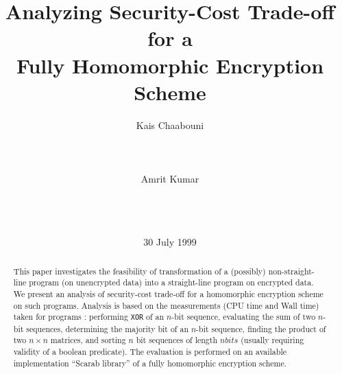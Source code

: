 \documentclass{acm_proc_article-sp}
\begin{document}
\title{Analyzing Security-Cost Trade-off for a \\ Fully Homomorphic Encryption Scheme}


%
\author{
\alignauthor
Kais Chaabouni \\
       \\
       \\
       \\
\alignauthor 
Amrit Kumar\\
       \\
       \\
       \\
}


\date{30 July 1999}
\maketitle
\begin{abstract}
This paper investigates the feasibility of transformation of a (possibly) non-straight-line program (on unencrypted data) into a straight-line program on encrypted data. We present an analysis of security-cost trade-off for a homomorphic encryption scheme on such programs. Analysis is based on the measurements (CPU time and  Wall time) taken for programs : performing \texttt{XOR} of an $n$-bit sequence,  evaluating the sum of two $n$-bit sequences, determining the majority bit of an $n$-bit sequence, finding the product of two $n \times n$ matrices, and sorting $n$ bit sequences of length $nbits$ (usually requiring validity of a boolean predicate). The evaluation is performed on an available implementation ``Scarab library'' of a fully homomorphic encryption scheme. 

\end{abstract}
\end{document}
